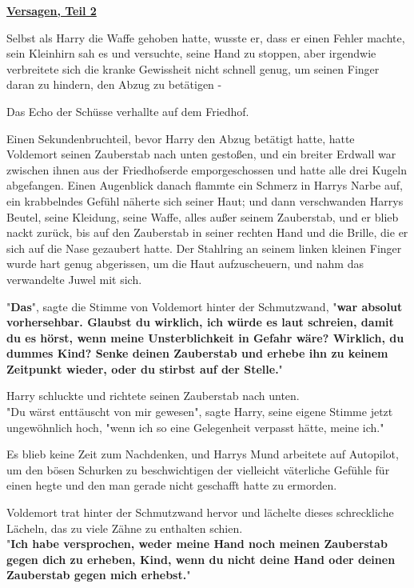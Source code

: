 

\hypertarget{versagen-teil-2}{%

\textbf{\uline{Versagen, Teil 2}}

Selbst als Harry die Waffe gehoben hatte, wusste er, dass er einen Fehler machte, sein Kleinhirn sah es und versuchte, seine Hand zu stoppen, aber irgendwie verbreitete sich die kranke Gewissheit nicht schnell genug, um seinen Finger daran zu hindern, den Abzug zu betätigen -

Das Echo der Schüsse verhallte auf dem Friedhof.

Einen Sekundenbruchteil, bevor Harry den Abzug betätigt hatte, hatte Voldemort seinen Zauberstab nach unten gestoßen, und ein breiter Erdwall war zwischen ihnen aus der Friedhofserde emporgeschossen und hatte alle drei Kugeln abgefangen. Einen Augenblick danach flammte ein Schmerz in Harrys Narbe auf, ein krabbelndes Gefühl näherte sich seiner Haut; und dann verschwanden Harrys Beutel, seine Kleidung, seine Waffe, alles außer seinem Zauberstab, und er blieb nackt zurück, bis auf den Zauberstab in seiner rechten Hand und die Brille, die er sich auf die Nase gezaubert hatte. Der Stahlring an seinem linken kleinen Finger wurde hart genug abgerissen, um die Haut aufzuscheuern, und nahm das verwandelte Juwel mit sich.

"\textbf{Das}", sagte die Stimme von Voldemort hinter der Schmutzwand, "\textbf{war absolut vorhersehbar. Glaubst du wirklich, ich würde es laut schreien, damit du es hörst, wenn meine Unsterblichkeit in Gefahr wäre? Wirklich, du dummes Kind? Senke deinen Zauberstab und erhebe ihn zu keinem Zeitpunkt wieder, oder du stirbst auf der Stelle.}"

Harry schluckte und richtete seinen Zauberstab nach unten.\\ "Du wärst enttäuscht von mir gewesen", sagte Harry, seine eigene Stimme jetzt ungewöhnlich hoch, "wenn ich so eine Gelegenheit verpasst hätte, meine ich."

Es blieb keine Zeit zum Nachdenken, und Harrys Mund arbeitete auf Autopilot, um den bösen Schurken zu beschwichtigen der vielleicht väterliche Gefühle für einen hegte und den man gerade nicht geschafft hatte zu ermorden.

Voldemort trat hinter der Schmutzwand hervor und lächelte dieses schreckliche Lächeln, das zu viele Zähne zu enthalten schien.\\ "\textbf{Ich habe versprochen, weder meine Hand noch meinen Zauberstab gegen dich zu erheben, Kind, wenn du nicht deine Hand oder deinen Zauberstab gegen mich erhebst.}"

}
